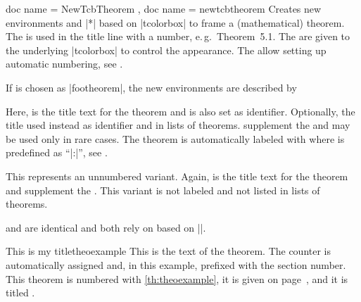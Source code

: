 \begin{docCommands}[
    doc parameter = \oarg{init options}\marg{name}\marg{display name}\marg{options}\marg{prefix},
    doc updated=2022-07-18
    ]
    {
      { doc name = NewTcbTheorem },
      { doc name = newtcbtheorem }
    }
  Creates new environments  and |*| based on |tcolorbox| to frame a
  (mathematical) theorem. The  is used in the title line
  with a number, e.\,g.\ \mbox{\flqq Theorem 5.1\frqq}.
  The  are given to the underlying |tcolorbox| to control
  the appearance.
  The  allow setting up automatic numbering,
  see .\par\medskip

  If  is chosen as |footheorem|, the new environments are described by
  \begin{docEnvironments}[
      doc no index,
      doc name = footheorem,
      doc parameter = \oarg{keys}\oarg{short}\marg{title}\marg{marker}
    ]{}
    Here,  is the title text for the theorem and
    is also set as  identifier.
    Optionally, the  title used instead as  identifier
    and in lists of theorems.
     supplement the  and may be
    used only in rare cases. The theorem is
    automatically labeled with 
    where  is predefined as \enquote{|:|}, see .
  \end{docEnvironments}
  \begin{docEnvironments}[
      doc no index,
      doc name = footheorem*,
      doc parameter = \oarg{keys}\marg{title}
    ]{}
    This represents an unnumbered variant. Again,  is the title text for the theorem
    and  supplement the .
    This variant is not labeled and not listed in lists of theorems.
  \end{docEnvironments}

  \begin{marker}
   and  are identical and both
  rely on  based on |\NewDocumentCommand|.
  \end{marker}
\clearpage


\begin{dispExample}
\begin{mytheo}{This is my title}{theoexample}
  This is the text of the theorem. The counter is automatically assigned and,
  in this example, prefixed with the section number. This theorem is numbered with
  \ref{th:theoexample}, it is given on page~\pageref{th:theoexample},
  and it is titled \flqq{}\frqq.
\end{mytheo}
\end{dispExample}



\end{docCommands}
